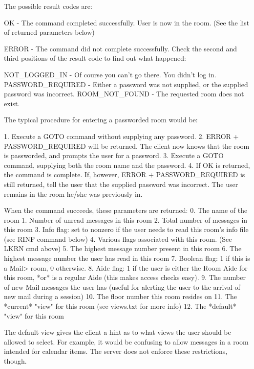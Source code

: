  The possible result codes are:

 OK    - The command completed successfully.  User is now in the room.
         (See the list of returned parameters below)

 ERROR - The command did not complete successfully.  Check the second and
third positions of the result code to find out what happened:

   NOT_LOGGED_IN     -  Of course you can't go there.  You didn't log in.
   PASSWORD_REQUIRED -  Either a password was not supplied, or the supplied
password was incorrect.
   ROOM_NOT_FOUND    -  The requested room does not exist.

 The typical procedure for entering a passworded room would be:

 1. Execute a GOTO command without supplying any password.
 2. ERROR + PASSWORD_REQUIRED will be returned.  The client now knows that
the room is passworded, and prompts the user for a password.
 3. Execute a GOTO command, supplying both the room name and the password.
 4. If OK is returned, the command is complete.  If, however,
ERROR + PASSWORD_REQUIRED is still returned, tell the user that the supplied
password was incorrect.  The user remains in the room he/she was previously
in.

 When the command succeeds, these parameters are returned:
   0. The name of the room
   1. Number of unread messages in this room
   2. Total number of messages in this room
   3. Info flag: set to nonzero if the user needs to read this room's info
      file (see RINF command below)
   4. Various flags associated with this room.  (See LKRN cmd above)
   5. The highest message number present in this room
   6. The highest message number the user has read in this room
   7. Boolean flag: 1 if this is a Mail> room, 0 otherwise.
   8. Aide flag: 1 if the user is either the Room Aide for this room, *or* is
a regular Aide (this makes access checks easy).
   9. The number of new Mail messages the user has (useful for alerting the
user to the arrival of new mail during a session)
  10. The floor number this room resides on
  11. The *current* "view" for this room (see views.txt for more info)
  12. The *default* "view" for this room

 The default view gives the client a hint as to what views the user should
be allowed to select.  For example, it would be confusing to allow messages
in a room intended for calendar items.  The server does not enforce these
restrictions, though.



